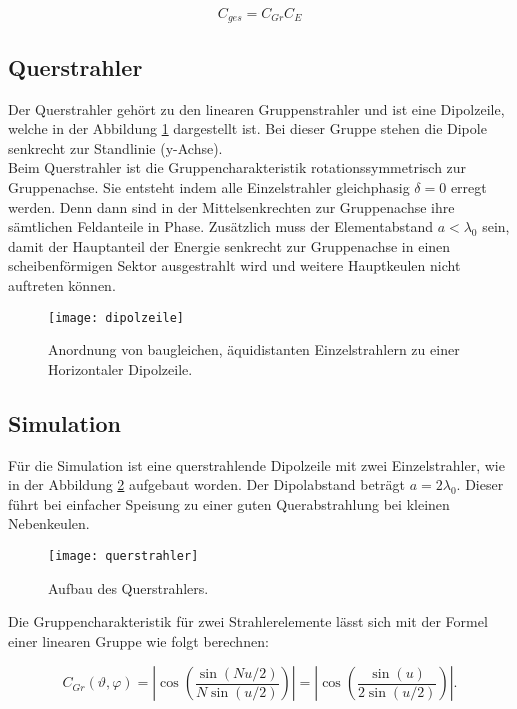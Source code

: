 \begin{equation}
C_{ges}=C_{Gr}C_{E}
\end{equation}


\subsection{Querstrahler}\label{sec:querstrahler}

Der Querstrahler gehört zu den linearen Gruppenstrahler und ist eine Dipolzeile, welche in der Abbildung \ref{fig:dipolzeile} dargestellt ist. Bei dieser Gruppe stehen die Dipole senkrecht zur Standlinie (y-Achse).\\

Beim Querstrahler ist die Gruppencharakteristik rotationssymmetrisch zur Gruppenachse. Sie entsteht indem alle Einzelstrahler gleichphasig $ \delta = 0$ erregt werden. Denn dann sind in der Mittelsenkrechten zur Gruppenachse ihre sämtlichen Feldanteile in Phase. Zusätzlich muss der Elementabstand $ a < \lambda_{0} $ sein, damit der Hauptanteil der Energie senkrecht zur Gruppenachse in einen scheibenförmigen Sektor ausgestrahlt wird und weitere Hauptkeulen nicht auftreten können. 

\begin{figure}[H]
	\centering
	\texttt{[image: dipolzeile]}
	\caption{Anordnung von baugleichen, äquidistanten Einzelstrahlern zu einer Horizontaler Dipolzeile.}\label{fig:dipolzeile}
\end{figure}

\subsection{Simulation}

Für die Simulation ist eine querstrahlende Dipolzeile mit zwei Einzelstrahler, wie in der Abbildung \ref{fig:querstrahler} aufgebaut worden. Der Dipolabstand beträgt $ a = 2\lambda_{0} $. Dieser führt bei einfacher Speisung zu einer guten Querabstrahlung bei kleinen Nebenkeulen. 

\begin{figure}[!ht]
	\centering
	\texttt{[image: querstrahler]}
	\caption{Aufbau des Querstrahlers.}\label{fig:querstrahler}
\end{figure}

Die Gruppencharakteristik für zwei Strahlerelemente lässt sich mit der Formel einer linearen Gruppe wie folgt berechnen:

\begin{equation}
C_{Gr}(\vartheta,\varphi) = \left|  \cos \left( \dfrac{\sin(N u/2)}{N \sin(u/2)}  \right) \right| = \left|  \cos \left( \dfrac{\sin(u)}{2 \sin(u/2)}  \right) \right|.
\end{equation}


